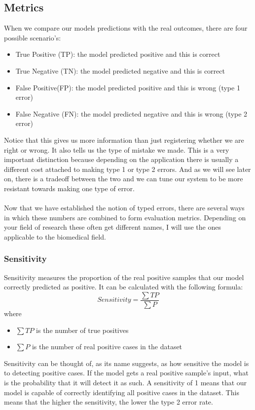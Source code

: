 \subsection{Metrics}
When we compare our models predictions with the real outcomes, there are four possible scenario's:
\begin{itemize}
	\item True Positive (TP): the model predicted positive and this is correct
	\item True Negative (TN): the model predicted negative and this is correct
	\item False Positive(FP): the model predicted positive and this is wrong (type 1 error)
	\item False Negative (FN): the model predicted negative and this is wrong (type 2 error)
\end{itemize}
Notice that this gives us more information than just registering whether we are right or wrong. It also tells us the type of mistake we made. This is a very important distinction because depending on the application there is usually a different cost attached to making type 1 or type 2 errors. And as we will see later on, there is a tradeoff between the two and we can tune our system to be more resistant towards making one type of error. \\ \\
Now that we have established the notion of typed errors, there are several ways in which these numbers are combined to form evaluation metrics. Depending on your field of research these often get different names, I will use the ones applicable to the biomedical field.
\subsubsection{Sensitivity}
Sensitivity\cite{wikisensspec} measures the proportion of the real positive samples that our model correctly predicted as positive. It can be calculated with the following formula:
$$
Sensitivity = \frac{\sum{TP}}{\sum{P}}
$$
where
\begin{itemize}
	\item $\sum{TP}$ is the number of true positives
	\item $\sum{P}$ is the number of real positive cases in the dataset
\end{itemize}
Sensitivity can be thought of, as its name suggests, as how sensitive the model is to detecting positive cases. If the model gets a real positive sample's input, what is the probability that it will detect it as such. A sensitivity of 1 means that our model is capable of correctly identifying all positive cases in the dataset. This means that the higher the sensitivity, the lower the type 2 error rate.
